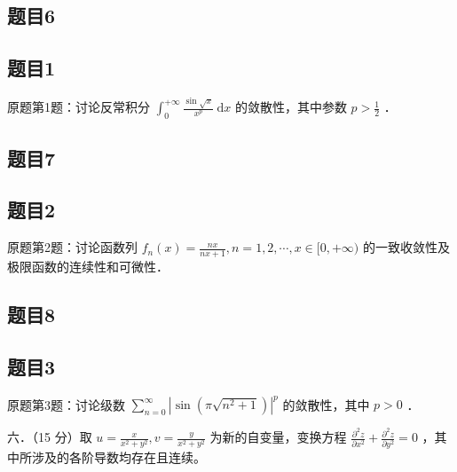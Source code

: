 \documentclass{article}
\begin{document}
\subsection{题目6}

\subsection{题目1}
原题第1题：讨论反常积分 \(\int_{0}^{+\infty} \frac{\sin \sqrt{x}}{x^{p}} \mathrm{~d} x\) 的敛散性，其中参数 \(p>\frac{1}{2}\) ．

\subsection{题目7}

\subsection{题目2}
原题第2题：讨论函数列 \(f_{n}(x)=\frac{n x}{n x+1}, n=1,2, \cdots, x \in[0,+\infty)\) 的一致收敛性及极限函数的连续性和可微性．

\subsection{题目8}

\subsection{题目3}
原题第3题：讨论级数 \(\sum_{n=0}^{\infty}\left|\sin \left(\pi \sqrt{n^{2}+1}\right)\right|^{p}\) 的敛散性，其中 \(p>0\) ．

六．（15 分）取 \(u=\frac{x}{x^{2}+y^{2}}, v=\frac{y}{x^{2}+y^{2}}\) 为新的自变量，变换方程 \(\frac{\partial^{2} z}{\partial x^{2}}+\frac{\partial^{2} z}{\partial y^{2}}=0\) ，其中所涉及的各阶导数均存在且连续。
\end{document}
